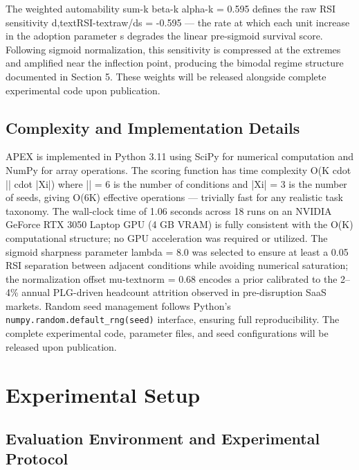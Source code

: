 \documentclass[10pt, conference]{IEEEtran}
\begin{document}
The weighted automability sum-k beta-k alpha-k = 0.595 defines the raw RSI sensitivity d,textRSI-textraw/ds = -0.595 --- the rate at which each unit increase in the adoption parameter s degrades the linear pre-sigmoid survival score. Following sigmoid normalization, this sensitivity is compressed at the extremes and amplified near the inflection point, producing the bimodal regime structure documented in Section 5. These weights will be released alongside complete experimental code upon publication.

\subsection{Complexity and Implementation Details}

\label{sec:complexity_and_implementation_details}

APEX is implemented in Python 3.11 using SciPy \cite{virtanen2020scipy} for numerical computation and NumPy for array operations. The scoring function has time complexity O(K cdot || cdot |Xi|) where || = 6 is the number of conditions and |Xi| = 3 is the number of seeds, giving O(6K) effective operations --- trivially fast for any realistic task taxonomy. The wall-clock time of 1.06 seconds across 18 runs on an NVIDIA GeForce RTX 3050 Laptop GPU (4 GB VRAM) is fully consistent with the O(K) computational structure; no GPU acceleration was required or utilized. The sigmoid sharpness parameter lambda = 8.0 was selected to ensure at least a 0.05 RSI separation between adjacent conditions while avoiding numerical saturation; the normalization offset mu-textnorm = 0.68 encodes a prior calibrated to the 2--4\% annual PLG-driven headcount attrition observed in pre-disruption SaaS markets. Random seed management follows Python's \texttt{numpy.random.default\_rng(seed)} interface, ensuring full reproducibility. The complete experimental code, parameter files, and seed configurations will be released upon publication.

\section{Experimental Setup}

\label{sec:experimental_setup}

\subsection{Evaluation Environment and Experimental Protocol}
\end{document}
